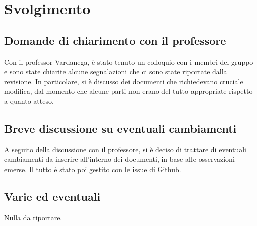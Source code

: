 \newpage
\section*{Svolgimento}

	\subsection*{Domande di chiarimento con il professore}
		Con il professor Vardanega, è stato tenuto un colloquio con i membri del gruppo e sono state chiarite alcune segnalazioni che ci sono state riportate dalla revisione. In particolare, si è discusso dei documenti che richiedevano cruciale modifica, dal momento che alcune parti non erano del tutto appropriate rispetto a quanto atteso.

	\subsection*{Breve discussione su eventuali cambiamenti}
		A seguito della discussione con il professore, si è deciso di trattare di eventuali cambiamenti da inserire all'interno dei documenti, in base alle osservazioni emerse. Il tutto è stato poi gestito con le issue di Github.

	\subsection*{Varie ed eventuali}
		Nulla da riportare.